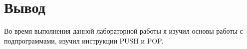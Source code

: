 \section{Вывод}
Во время выполнения данной лабораторной работы я изучил
основы работы с подпрограммами, изучил инструкции PUSH и POP.